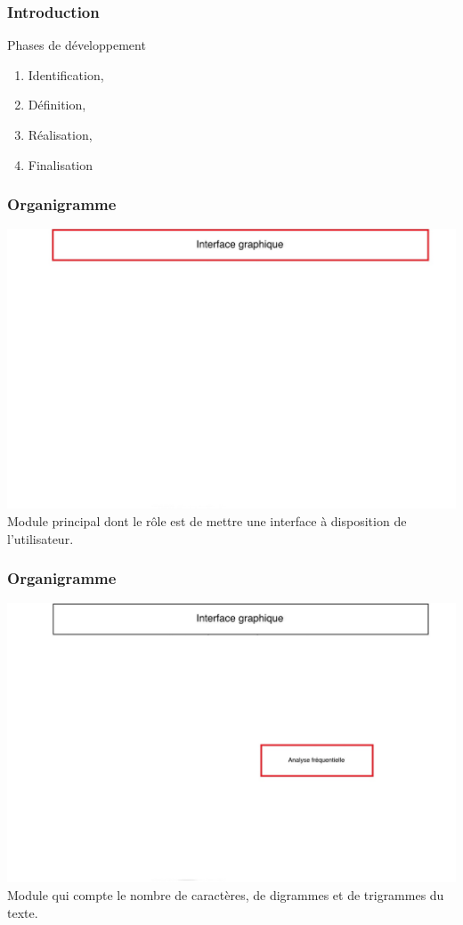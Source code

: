\documentclass[10pt,xcolor=table]{beamer}
\begin{document}
\begin{frame}[<+->]
  \frametitle{Introduction}

  \begin{block}{Phases de développement}
   
    \begin{enumerate}
    \item Identification,
    \item Définition,
    \item Réalisation,
    \item Finalisation
    \end{enumerate}
  \end{block}

\end{frame}
\begin{frame}
  \frametitle{Organigramme}
\includegraphics[scale = 0.28]{Org1.jpg}\\
Module principal dont le rôle est de mettre une interface à disposition de l'utilisateur.
\end{frame}
\begin{frame}
  \frametitle{Organigramme}
\includegraphics[scale = 0.28]{Org2.jpg}\\
Module qui compte le nombre de caractères, de digrammes et de trigrammes du texte.
\end{frame}
\end{document}
